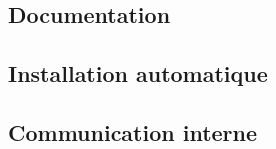 		\subsection{Documentation}
		
			
		\subsection{Installation automatique}
		
				
		\subsection{Communication interne}
		
